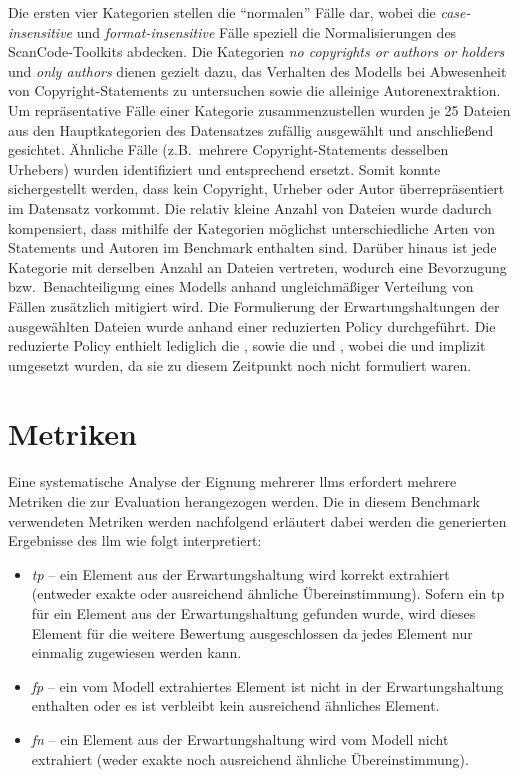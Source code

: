 Die ersten vier Kategorien stellen die \enquote{normalen} Fälle dar, wobei die \textit{case-insensitive} und \textit{format-insensitive} Fälle speziell die Normalisierungen des ScanCode-Toolkits abdecken.
Die Kategorien \textit{no copyrights or authors or holders} und \textit{only authors} dienen gezielt dazu, das Verhalten des Modells bei Abwesenheit von Copyright-Statements zu untersuchen sowie die alleinige Autorenextraktion.
Um repräsentative Fälle einer Kategorie zusammenzustellen wurden je \num{25} Dateien aus den Hauptkategorien des Datensatzes zufällig ausgewählt und anschließend gesichtet.
Ähnliche Fälle (z.B.\ mehrere Copyright-Statements desselben Urhebers) wurden identifiziert und entsprechend ersetzt.
Somit konnte sichergestellt werden, dass kein Copyright, Urheber oder Autor überrepräsentiert im Datensatz vorkommt.
Die relativ kleine Anzahl von Dateien wurde dadurch kompensiert, dass mithilfe der Kategorien möglichst unterschiedliche Arten von Statements und Autoren im Benchmark enthalten sind.
Darüber hinaus ist jede Kategorie mit derselben Anzahl an Dateien vertreten, wodurch eine Bevorzugung bzw.\ Benachteiligung eines Modells anhand ungleichmäßiger Verteilung von Fällen zusätzlich mitigiert wird.
Die Formulierung der Erwartungshaltungen der ausgewählten Dateien wurde anhand einer reduzierten Policy durchgeführt.
Die reduzierte Policy enthielt lediglich die , sowie die  und , wobei die  und  implizit umgesetzt wurden, da sie zu diesem Zeitpunkt noch nicht formuliert waren.


\section{Metriken}\label{sec:metriken-benchmark}

Eine systematische Analyse der Eignung mehrerer \glspl{llm} erfordert mehrere Metriken die zur Evaluation herangezogen werden.
Die in diesem Benchmark verwendeten Metriken werden nachfolgend erläutert dabei werden die generierten Ergebnisse des \gls{llm} wie folgt interpretiert:
\begin{itemize}
    \item \textit{\gls{tp}} -- ein Element aus der Erwartungshaltung wird korrekt extrahiert (entweder exakte oder ausreichend ähnliche Übereinstimmung). Sofern ein \gls{tp} für ein Element aus der Erwartungshaltung gefunden wurde, wird dieses Element für die weitere Bewertung ausgeschlossen da jedes Element nur einmalig zugewiesen werden kann.
    \item \textit{\gls{fp}} -- ein vom Modell extrahiertes Element ist nicht in der Erwartungshaltung enthalten oder es ist verbleibt kein ausreichend ähnliches Element.
    \item \textit{\gls{fn}} -- ein Element aus der Erwartungshaltung wird vom Modell nicht extrahiert (weder exakte noch ausreichend ähnliche Übereinstimmung).
\end{itemize}

